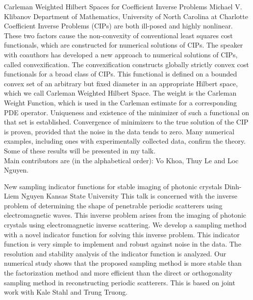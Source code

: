 \vspace{1.5ex}
\abs
{Carleman Weighted Hilbert Spaces for Coefficient Inverse Problems}
{Michael V. Klibanov}
{Department of Mathematics, University of North Carolina at Charlotte}
{Coefficient Inverse Problems (CIPs) are both ill-posed and highly nonlinear. These two factors cause the non-convexity of conventional least squares cost functionals, which are constructed for numerical solutions of CIPs. The speaker with coauthors has developed a new approach to numerical solutions of CIPs, called convexification. The convexification constructs globally strictly convex cost functionals for a broad class of CIPs. This functional is defined on a bounded convex set of an arbitrary but fixed diameter in an appropriate Hilbert space, which we call Carleman Weighted Hilbert Space. The weight is the Carleman Weight Function, which is used in the Carleman estimate for a corresponding PDE operator. Uniqueness and existence of the minimizer of such a functional on that set is established. Convergence of minimizers to the true solution of the CIP is proven, provided that the noise in the data tends to zero. Many numerical examples, including ones with experimentally collected data, confirm the theory.\\
Some of these results will be presented in my talk.\\
Main contributors are (in the alphabetical order): Vo Khoa, Thuy Le and Loc Nguyen.}


\vspace{1.5ex}
\abs
{New sampling indicator functions for stable imaging of photonic crystals}
{Dinh-Liem Nguyen}
{Kansas State University}
{This talk is concerned with the inverse problem of determining the shape of penetrable periodic scatterers using electromagnetic waves. This inverse problem arises from the imaging of photonic crystals using electromagnetic inverse scattering. We develop a sampling method with a novel indicator function for solving this inverse problem. This indicator function is very simple to implement and robust against noise in the data. The resolution and stability analysis of the indicator function is analyzed. Our numerical study shows that the proposed sampling method is more stable than the factorization method and more efficient than the direct or orthogonality sampling method in reconstructing periodic scatterers. This is based on joint work with Kale Stahl and Trung Truong.}


